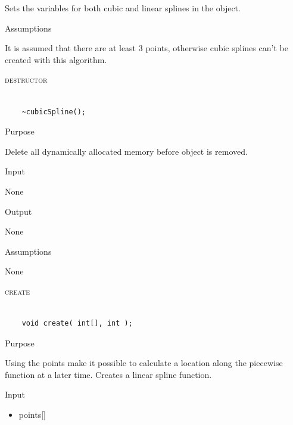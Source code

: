 \documentclass[pdftex, 11pt]{article}
\begin{document}
\begin{description}
\begin{description}
				Sets the variables for both cubic and linear splines in the object.

			\item{Assumptions}

				It is assumed that there are at least 3 points, otherwise cubic splines can't
				be created with this algorithm.

		\end{description}


	\item{\textsc{destructor}}

		\begin{lstlisting}

	~cubicSpline();
		\end{lstlisting}

		\begin{description}
			\item{Purpose}

				Delete all dynamically allocated memory before object is removed.

			\item{Input}

				None

			\item{Output}

				None

			\item{Assumptions}

				None

		\end{description}


	\item{\textsc{create}}

		\begin{lstlisting}

	void create( int[], int );
		\end{lstlisting}

		\begin{description}
			\item{Purpose}

				Using the points make it possible to calculate a location along the
				piecewise function at a later time.  Creates a linear spline function.

			\item{Input}

				\begin{itemize}

					\item{points[]}


\end{itemize}
\end{description}
\end{description}
\end{document}
